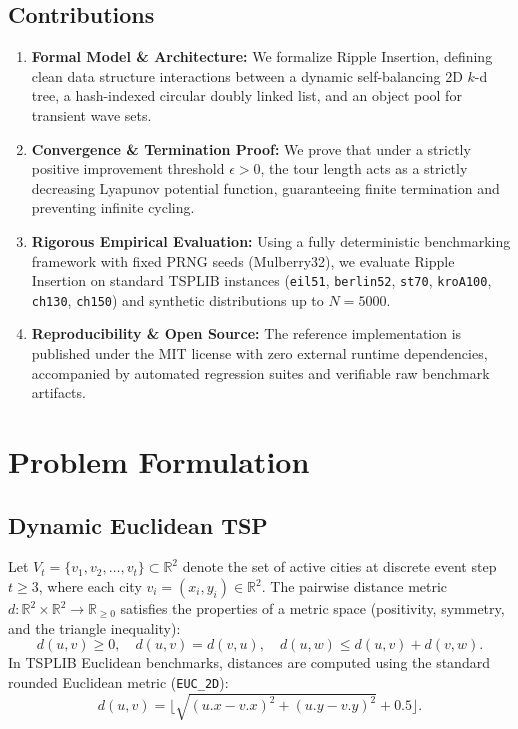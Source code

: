 \documentclass{article}
\theoremstyle{definition}
\begin{document}
\subsection{Contributions}
\begin{enumerate}
    \item \textbf{Formal Model \& Architecture:} We formalize Ripple Insertion, defining clean data structure interactions between a dynamic self-balancing 2D $k$-d tree, a hash-indexed circular doubly linked list, and an object pool for transient wave sets.
    \item \textbf{Convergence \& Termination Proof:} We prove that under a strictly positive improvement threshold $\epsilon > 0$, the tour length acts as a strictly decreasing Lyapunov potential function, guaranteeing finite termination and preventing infinite cycling.
    \item \textbf{Rigorous Empirical Evaluation:} Using a fully deterministic benchmarking framework with fixed PRNG seeds (Mulberry32), we evaluate Ripple Insertion on standard TSPLIB instances (\texttt{eil51}, \texttt{berlin52}, \texttt{st70}, \texttt{kroA100}, \texttt{ch130}, \texttt{ch150}) and synthetic distributions up to $N = 5000$.
    \item \textbf{Reproducibility \& Open Source:} The reference implementation is published under the MIT license with zero external runtime dependencies, accompanied by automated regression suites and verifiable raw benchmark artifacts.
\end{enumerate}

\section{Problem Formulation}

\subsection{Dynamic Euclidean TSP}

Let $V_t = \{v_1, v_2, \dots, v_t\} \subset \mathbb{R}^2$ denote the set of active cities at discrete event step $t \ge 3$, where each city $v_i = (x_i, y_i) \in \mathbb{R}^2$. The pairwise distance metric $d: \mathbb{R}^2 \times \mathbb{R}^2 \to \mathbb{R}_{\ge 0}$ satisfies the properties of a metric space (positivity, symmetry, and the triangle inequality):
\begin{equation}
d(u, v) \ge 0, \quad d(u, v) = d(v, u), \quad d(u, w) \le d(u, v) + d(v, w).
\end{equation}
In TSPLIB Euclidean benchmarks, distances are computed using the standard rounded Euclidean metric (\texttt{EUC\_2D}):
\begin{equation}
d(u, v) = \lfloor \sqrt{(u.x - v.x)^2 + (u.y - v.y)^2} + 0.5 \rfloor.
\end{equation}
\end{document}
